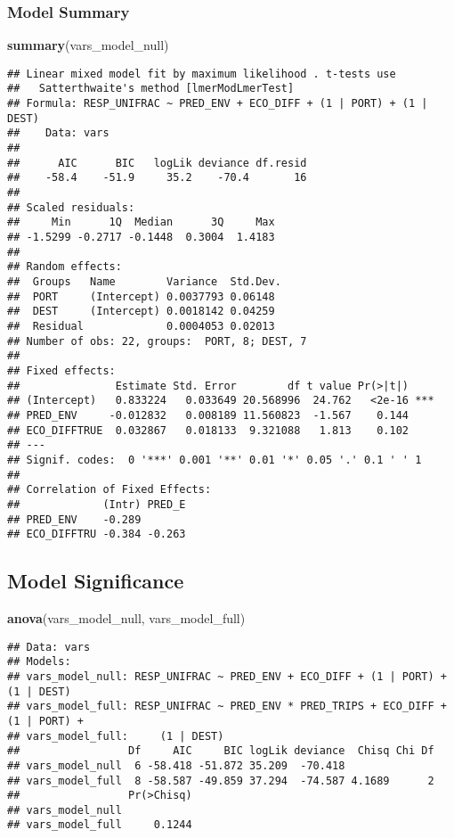 \documentclass[]{article}
\newenvironment{Shaded}{\begin{snugshade}}{\end{snugshade}}
\newcommand{\KeywordTok}[1]{\textcolor[rgb]{0.13,0.29,0.53}{\textbf{#1}}}
\newcommand{\NormalTok}[1]{#1}
\begin{document}
\subsubsection{Model Summary}\label{model-summary-1}

\begin{Shaded}
\begin{Highlighting}[]
\KeywordTok{summary}\NormalTok{(vars_model_null)}
\end{Highlighting}
\end{Shaded}

\begin{verbatim}
## Linear mixed model fit by maximum likelihood . t-tests use
##   Satterthwaite's method [lmerModLmerTest]
## Formula: RESP_UNIFRAC ~ PRED_ENV + ECO_DIFF + (1 | PORT) + (1 | DEST)
##    Data: vars
## 
##      AIC      BIC   logLik deviance df.resid 
##    -58.4    -51.9     35.2    -70.4       16 
## 
## Scaled residuals: 
##     Min      1Q  Median      3Q     Max 
## -1.5299 -0.2717 -0.1448  0.3004  1.4183 
## 
## Random effects:
##  Groups   Name        Variance  Std.Dev.
##  PORT     (Intercept) 0.0037793 0.06148 
##  DEST     (Intercept) 0.0018142 0.04259 
##  Residual             0.0004053 0.02013 
## Number of obs: 22, groups:  PORT, 8; DEST, 7
## 
## Fixed effects:
##               Estimate Std. Error        df t value Pr(>|t|)    
## (Intercept)   0.833224   0.033649 20.568996  24.762   <2e-16 ***
## PRED_ENV     -0.012832   0.008189 11.560823  -1.567    0.144    
## ECO_DIFFTRUE  0.032867   0.018133  9.321088   1.813    0.102    
## ---
## Signif. codes:  0 '***' 0.001 '**' 0.01 '*' 0.05 '.' 0.1 ' ' 1
## 
## Correlation of Fixed Effects:
##             (Intr) PRED_E
## PRED_ENV    -0.289       
## ECO_DIFFTRU -0.384 -0.263
\end{verbatim}

\subsection{Model Significance}\label{model-significance}

\begin{Shaded}
\begin{Highlighting}[]
\KeywordTok{anova}\NormalTok{(vars_model_null, vars_model_full)}
\end{Highlighting}
\end{Shaded}

\begin{verbatim}
## Data: vars
## Models:
## vars_model_null: RESP_UNIFRAC ~ PRED_ENV + ECO_DIFF + (1 | PORT) + (1 | DEST)
## vars_model_full: RESP_UNIFRAC ~ PRED_ENV * PRED_TRIPS + ECO_DIFF + (1 | PORT) + 
## vars_model_full:     (1 | DEST)
##                 Df     AIC     BIC logLik deviance  Chisq Chi Df
## vars_model_null  6 -58.418 -51.872 35.209  -70.418              
## vars_model_full  8 -58.587 -49.859 37.294  -74.587 4.1689      2
##                 Pr(>Chisq)
## vars_model_null           
## vars_model_full     0.1244
\end{verbatim}
\end{document}
